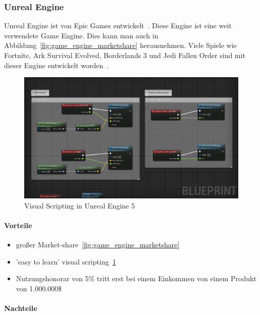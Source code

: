 \subsubsection{Unreal Engine}
\label{sec:unreal_engine}

Unreal Engine ist von Epic Games entwickelt~\cite{UNEAL_ENGINE_OWNER_2022}.
Diese Engine ist eine weit verwendete Game Engine.
Dies kann man auch in Abbildung~\ref{fig:game_engine_marketshare} herausnehmen.
Viele Spiele wie Fortnite, Ark Survival Evolved, Borderlands 3 und Jedi Fallen Order sind mit dieser Engine entwickelt worden~\cite{WIKIPEDIA_UNREAL_GAME_LIST}.

\begin{figure}
    \centering
    \includegraphics[scale=0.3]{pics/visual_scripting_unreal_engine}
    \caption{Visual Scripting in Unreal Engine 5}
    \label{fig:visual_scripting_unreal_engine}
\end{figure}

\paragraph{Vorteile}

\begin{itemize}
    \item großer Market-share~\ref{fig:game_engine_marketshare}
    \item 'easy to learn' visual scripting~\ref{fig:visual_scripting_unreal_engine}
    \item Nutzungshonorar von 5\% tritt erst bei einem Einkommen von einem Produkt von 1.000.000\$~\cite{UNREAL_ENGINE_PRICING_2022}
\end{itemize}

\paragraph{Nachteile}

